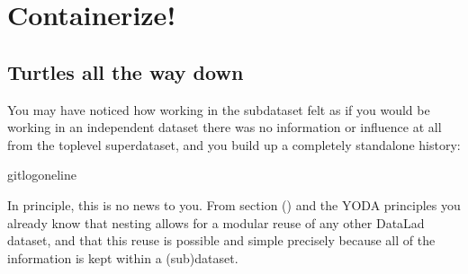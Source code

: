 \chapter{Containerize!}
\label{\detokenize{basics/basics-containers:containerize}}\label{\detokenize{basics/basics-containers:chapter-containersrun}}\label{\detokenize{basics/basics-containers::doc}}

\sphinxstepscope

\ignorespaces 

\section{Turtles all the way down}
\label{\detokenize{basics/101-132-advancednesting:turtles-all-the-way-down}}\label{\detokenize{basics/101-132-advancednesting:nesting2}}\label{\detokenize{basics/101-132-advancednesting:index-0}}\label{\detokenize{basics/101-132-advancednesting::doc}}
\sphinxAtStartPar
You may have noticed how working in the subdataset felt as if you would be
working in an independent dataset \textendash{} there was no information or influence at
all from the top\sphinxhyphen{}level  superdataset, and you build up a
completely stand\sphinxhyphen{}alone history:

\begin{sphinxVerbatim}[commandchars=\\\{\}]
gitlog\PYGZhy{}\PYGZhy{}oneline
\end{sphinxVerbatim}

\sphinxAtStartPar
In principle, this is no news to you. From section {\hyperref[\detokenize{basics/101-106-nesting:nesting}]{}} () and the
YODA principles you already know that nesting allows for a modular reuse of
any other DataLad dataset, and that this reuse is possible and simple
precisely because all of the information is kept within a (sub)dataset.

